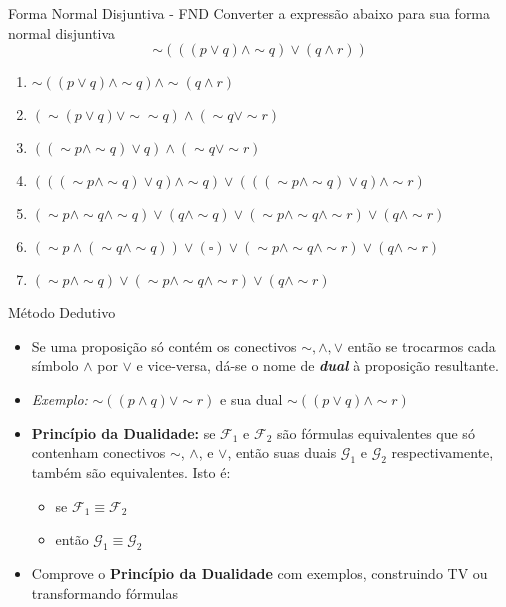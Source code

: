 \begin{frame}[t]{Forma Normal Disjuntiva - FND}
	Converter a expressão abaixo para sua forma normal disjuntiva $$\sim(((p \vee q) \wedge \sim q) \vee (q \wedge r))$$

	\vskip 0.25cm

	\begin{enumerate}
	\item $\sim((p \vee q) \wedge \sim q) \wedge \sim(q \wedge r)$
	\item $(\sim(p \vee q) \vee \sim\sim q) \wedge (\sim q \vee \sim r)$
	\item $((\sim p \wedge \sim q) \vee q) \wedge (\sim q \vee \sim r)$
	\item $(((\sim p \wedge \sim q) \vee q) \wedge \sim q) \vee (((\sim p \wedge \sim q) \vee q) \wedge \sim r)$
	\item $(\sim p \wedge \sim q \wedge \sim q) \vee (q \wedge \sim q) \vee (\sim p \wedge \sim q \wedge \sim r) \vee (q \wedge \sim r)$
	\item $(\sim p \wedge (\sim q \wedge \sim q)) \vee (\square) \vee (\sim p \wedge \sim q \wedge \sim r) \vee (q \wedge \sim r)$
	\item $(\sim p \wedge \sim q) \vee (\sim p \wedge \sim q \wedge \sim r) \vee (q \wedge \sim r)$	\end{enumerate}
\end{frame}

\begin{frame}[t]{Método Dedutivo}
	\begin{itemize}
	\item Se uma proposição só contém os conectivos $\sim, \wedge, \vee$ então se trocarmos cada símbolo $\wedge$ por $\vee$ e vice-versa, dá-se o nome de {\em\bf dual} à proposição resultante.
	
	\item {\em Exemplo:} $\sim ((p \wedge q) \vee\sim r)$ e sua dual $\sim ((p \vee q) \wedge\sim r)$ 
	
	\item {\bf Princípio da Dualidade:} se $\mathcal{F}_1$ e $\mathcal{F}_2$ são fórmulas equivalentes que só contenham conectivos $\sim$, $\wedge$, e $\vee$, então suas duais $\mathcal{G}_1$ e $\mathcal{G}_2$ respectivamente, também são  equivalentes. Isto é:
	
	\begin{itemize}
	  \item se \hspace{1.5cm} $\mathcal{F}_1 \equiv \mathcal{F}_2$
	  \item então \hspace{1cm} $\mathcal{G}_1 \equiv \mathcal{G}_2$
	\end{itemize}
	
	
	\item Comprove o {\bf Princípio da Dualidade} com exemplos, construindo TV ou transformando
	fórmulas
	
	\end{itemize}
\end{frame}

